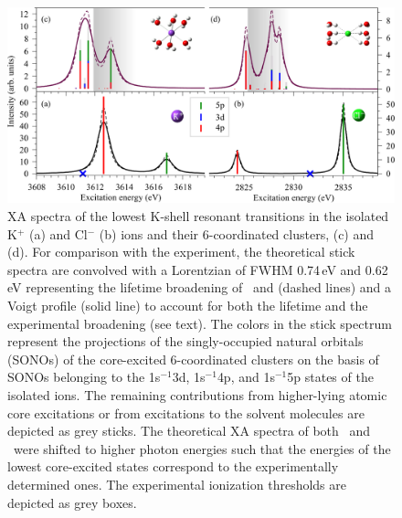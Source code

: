 

\begin{figure}[h!]
\centering
\includegraphics[scale=0.55]{figures/xas_spectra.eps}
\caption{XA spectra of the lowest K-shell resonant transitions in the isolated
K$^{+}$ (a) and Cl$^{-}$ (b) ions and their 6-coordinated clusters, (c) and (d).
For comparison with the experiment, the theoretical stick spectra are convolved
with a Lorentzian of FWHM 0.74\,eV and 0.62\,eV representing the lifetime
broadening of \ki~and \cli \citep{Krause79:329} (dashed lines) and a Voigt
profile (solid line) to account for both the lifetime and the experimental
broadening (see text). The colors in the stick spectrum represent the projections
of the singly-occupied natural orbitals (SONOs) of the core-excited 6-coordinated
clusters on the basis of SONOs belonging to the 1s$^{-1}$3d, 1s$^{-1}$4p, and
1s$^{-1}$5p states of the isolated ions. The remaining contributions from
higher-lying atomic core excitations or from excitations to the solvent molecules
are depicted as grey sticks. The theoretical XA spectra of both \ki~and \cli~were
shifted to higher photon energies such that the energies of the lowest core-excited states correspond to the experimentally determined ones. The experimental ionization thresholds are depicted as grey boxes.}
\label{fg:xas_kcl}
\end{figure}

